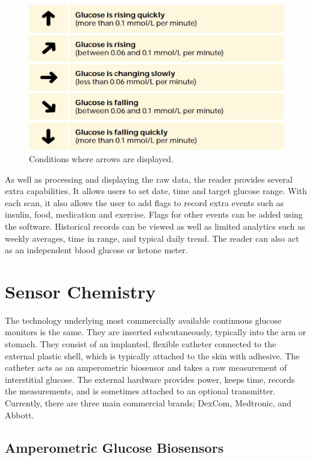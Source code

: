 \begin{figure}[ht]
\centering\includegraphics[width=1.0\linewidth]{images/arrows.png}
\caption{Conditions where arrows are displayed.}
\label{fig:arrows}
\end{figure}

As well as processing and displaying the raw data, the reader provides several extra capabilities. It allows users to set date, time and target glucose range. With each scan, it also allows the user to add flags to record extra events such as insulin, food, medication and exercise. Flags for other events can be added using the software. Historical records can be viewed as well as limited analytics such as weekly averages, time in range, and typical daily trend. The reader can also act as an independent blood glucose or ketone meter.  

\section{Sensor Chemistry}

The technology underlying most commercially available continuous glucose monitors is the same. They are inserted subcutaneously, typically into the arm or stomach. They consist of an implanted, flexible catheter connected to the external plastic shell, which is typically attached to the skin with adhesive. The catheter acts as an amperometric biosensor and takes a raw measurement of interstitial glucose. The external hardware provides power, keeps time, records the measurements, and is sometimes attached to an optional transmitter. Currently, there are three main commercial brands; DexCom, Medtronic, and Abbott.

\subsection{Amperometric Glucose Biosensors}


